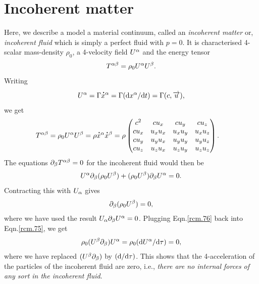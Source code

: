 \section{Incoherent matter}
Here, we describe a model a material continuum,  called 
an \textsl{incoherent matter} or, \textsl{incoherent  
fluid} which is  simply a perfect fluid with $p=0$. It 
is characterised 4-scalar  mass-density $\rho_0$, a 
4-velocity field $U^{{\alpha}}$ and the energy tensor
\begin{align}\label{rcm.72}
T^{{\alpha}{\beta}}=\rho_0 U^{{\alpha}} U^{{\beta}}.
\end{align}
Writing
\begin{align}\label{rcm.73}
U^{{\alpha}} = \Gamma  {\ensuremath{\overset{\hspace*{1.5pt}\centerdot}{x}} }{}^{{\alpha}}
=\Gamma (\mathrm{d} x^{{\alpha}}/\mathrm{d} t)=\Gamma(c,\overrightarrow{u}),
\end{align}
we get
\begin{align}\label{rcm.74}
T^{{\alpha}{\beta}}&= \rho_0 U^{{\alpha}} U^{{\beta}}  =\rho {\ensuremath{\overset{\hspace*{1.5pt}\centerdot}{x}} }{}^{{\alpha}}
{\overset{\hspace*{1.5pt}\centerdot}{x} }{}^{{\beta}} =\rho
\begin{pmatrix}
c^2 & c u_x & c u_y & c u_z\\
c u_x &  u_x u_x&u_x u_y& u_x u_z\\
c u_y &  u_y u_x & u_y u_y  & u_y u_z\\
c u_z &  u_z u_x & u_z u_y  & u_z u_z
\end{pmatrix} .
\end{align}
The equations ${\partial}_{{\beta}} T^{{\alpha}{\beta}}=0 $ for the incoherent
fluid would then be
\begin{align} \label{rcm.75}
U^{{\alpha}}{\partial}_{{\beta}} (\rho_0 U^{{\beta}} )
+(\rho_0 U^{{\beta}} ){\partial}_{{\beta}} U^{{\alpha}} =0.
\end{align}
Contracting this with $U_{{\alpha}}$ gives
\begin{align}\label{rcm.76}
{\ensuremath{\partial}}_{{\beta}} (\rho_0 U^{{\beta}} ) =0,
\end{align}
where we have used the result $U_{{\alpha}} {\partial}_{{\beta}} U^{{\alpha}} =0$. 
Plugging Eqn.\eqref{rcm.76} back into Eqn.\eqref{rcm.75}, 
we 
get
\begin{align}\label{rcm.77}
\rho_0 (U^{{\beta}}  {\partial}_{{\beta}}) U^{{\alpha}}
=\rho_0 (\mathrm{d} U^{{\alpha}}/\mathrm{d} {\tau}) =0,
\end{align}
where we have replaced $(U^{{\beta}} {\partial}_{{\beta}})$ by $(\mathrm{d} 
/\mathrm{d} {\tau})$. 
This shows that the 4-acceleration of the particles of the 
incoherent fluid are zero, i.e., \textsl{there are no 
internal forces of any sort in the incoherent fluid}.

